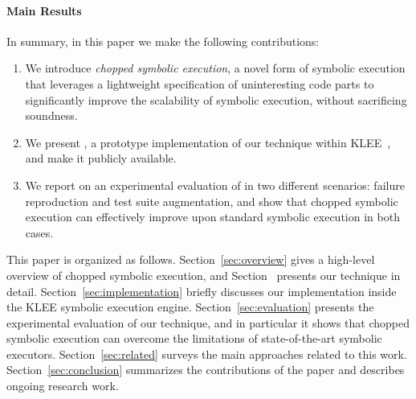 \paragraph{Main Results}
In summary, in this paper we make the following contributions:
\begin{enumerate}[leftmargin=*]
\item We introduce \emph{chopped symbolic execution}, a novel form of
  symbolic execution that leverages a lightweight specification of
  uninteresting code parts to significantly improve the scalability of
  symbolic execution, without sacrificing soundness.

\item We present \toolname, a prototype implementation of our
  technique within KLEE~\cite{klee}, and make it publicly available.

\item We report on an experimental evaluation of \toolname in two
  different scenarios: failure reproduction and test suite
  augmentation, and show that chopped symbolic execution can
  effectively improve upon standard symbolic execution in both cases.
\end{enumerate}

This paper is organized as follows. Section~\ref{sec:overview} gives a
high-level overview of chopped symbolic execution, and
Section~ presents our technique in detail.
Section~\ref{sec:implementation} briefly discusses our implementation
inside the KLEE symbolic execution
engine. Section~\ref{sec:evaluation} presents the experimental
evaluation of our technique, and in particular it shows that chopped
symbolic execution can overcome the limitations of state-of-the-art
symbolic executors. Section~\ref{sec:related} surveys the main
approaches related to this work. Section~\ref{sec:conclusion}
summarizes the contributions of the paper and describes ongoing
research work.

